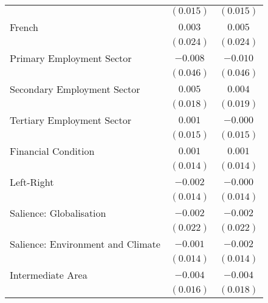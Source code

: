 \begin{center}
\begin{tiny}
\begin{longtable}{l@{} c@{} c@{}}
                                                         & $(0.015)$        & $(0.015)$        \\
\quad French                                             & $0.003$          & $0.005$          \\
                                                         & $(0.024)$        & $(0.024)$        \\
\quad Primary Employment Sector                          & $-0.008$         & $-0.010$         \\
                                                         & $(0.046)$        & $(0.046)$        \\
\quad Secondary Employment Sector                        & $0.005$          & $0.004$          \\
                                                         & $(0.018)$        & $(0.019)$        \\
\quad Tertiary Employment Sector                         & $0.001$          & $-0.000$         \\
                                                         & $(0.015)$        & $(0.015)$        \\
\quad Financial Condition                                & $0.001$          & $0.001$          \\
                                                         & $(0.014)$        & $(0.014)$        \\
\quad Left-Right                                         & $-0.002$         & $-0.000$         \\
                                                         & $(0.014)$        & $(0.014)$        \\
\quad Salience: Globalisation                            & $-0.002$         & $-0.002$         \\
                                                         & $(0.022)$        & $(0.022)$        \\
\quad Salience: Environment and Climate                  & $-0.001$         & $-0.002$         \\
                                                         & $(0.014)$        & $(0.014)$        \\
Intermediate Area                                        & $-0.004$         & $-0.004$         \\
                                                         & $(0.016)$        & $(0.018)$        \\

\end{longtable}
\end{tiny}
\end{center}
